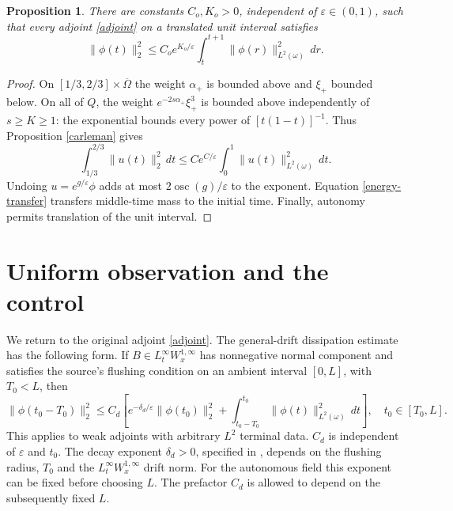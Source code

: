 \documentclass[11pt]{article}
\newtheorem{proposition}[theorem]{Proposition}
\theoremstyle{remark}
\newcommand{\eps}{\varepsilon}
\newcommand{\osc}{\operatorname{osc}}
\begin{document}
\begin{proposition}\label{coarse}
There are constants $C_o,K_o>0$, independent of $\eps\in(0,1)$, such that
every adjoint \eqref{adjoint} on a translated unit interval satisfies
\begin{equation}\label{coarse-observation}
 \|\phi(t)\|_2^2\le C_oe^{K_o/\eps}
              \int_t^{t+1}\|\phi(r)\|_{L^2(\omega)}^2\,dr.
\end{equation}
\end{proposition}
\begin{proof}
On $[1/3,2/3]\times\overline\Omega$ the weight $\alpha_+$ is bounded
above and $\xi_+$ bounded below. On all of $Q$, the weight
$e^{-2s\alpha_+}\xi_+^3$ is bounded above independently of $s\ge K\ge1$:
the exponential bounds every power of $[t(1-t)]^{-1}$. Thus
Proposition \ref{carleman} gives
\[
 \int_{1/3}^{2/3}\|u(t)\|_2^2\,dt
 \le C e^{C/\eps}\int_0^1\|u(t)\|_{L^2(\omega)}^2\,dt.
\]
Undoing $u=e^{g/\eps}\phi$ adds at most $2\osc(g)/\eps$ to the exponent.
Equation \eqref{energy-transfer} transfers middle-time mass to the initial
time. Finally, autonomy permits translation of the unit interval.
\end{proof}

\section{Uniform observation and the control}\label{sec:uniform}

We return to the original adjoint \eqref{adjoint}. The general-drift
dissipation estimate \cite[Proposition 4.7(1), equation (51)]{Outward} has the
following form. If $B\in L^\infty_tW^{1,\infty}_x$ has nonnegative normal
component and satisfies the source's flushing condition on an ambient
interval $[0,L]$, with $T_0<L$, then
\begin{equation}\label{dissipation}
 \|\phi(t_0-T_0)\|_2^2\le C_d\left[
 e^{-\delta_d/\eps}\|\phi(t_0)\|_2^2+
 \int_{t_0-T_0}^{t_0}\|\phi(t)\|_{L^2(\omega)}^2\,dt\right],
 \quad t_0\in[T_0,L].
\end{equation}
This applies to weak adjoints with arbitrary $L^2$ terminal data.
$C_d$ is independent of $\eps$ and $t_0$. The decay exponent
$\delta_d>0$, specified in \cite[Proposition 4.5]{Outward}, depends on the
flushing radius, $T_0$ and the $L^\infty_tW^{1,\infty}_x$ drift norm.
For the autonomous field this exponent can be fixed before choosing $L$.
The prefactor $C_d$ is allowed to depend on the subsequently fixed $L$.
\end{document}
